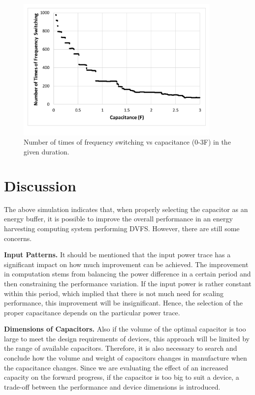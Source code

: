 \begin{figure} [!tb]
    \centering
    \includegraphics[width=10cm]{figure/work2/fsw}
    \caption{Number of times of frequency switching vs capacitance (0-3F) in the given duration.}
    \label{Figure:fsw}
\end{figure} 

\section{Discussion}
The above simulation indicates that, when properly selecting the capacitor as an energy buffer, it is possible to improve the overall performance in an energy harvesting computing system performing DVFS. However, there are still some concerns.

\textbf{Input Patterns.} It should be mentioned that the input power trace has a significant impact on how much improvement can be achieved. The improvement in computation stems from balancing the power difference in a certain period and then constraining the performance variation. If the input power is rather constant within this period, which implied that there is not much need for scaling performance, this improvement will be insignificant. Hence, the selection of the proper capacitance depends on the particular power trace. 

\textbf{Dimensions of Capacitors.} Also if the volume of the optimal capacitor is too large to meet the design requirements of devices, this approach will be limited by the range of available capacitors. Therefore, it is also necessary to search and conclude how the volume and weight of capacitors changes in manufacture when the capacitance changes. Since we are evaluating the effect of an increased capacity on the forward progress, if the capacitor is too big to suit a device, a trade-off between the performance and device dimensions is introduced.

